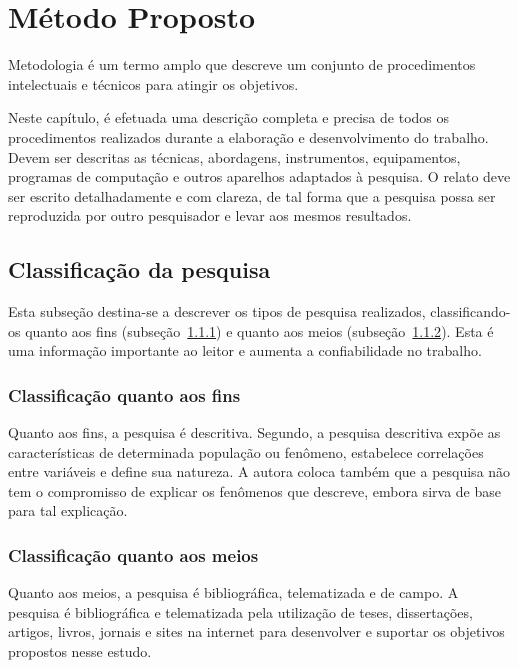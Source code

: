 \chapter{Método Proposto}
\label{cap:metodologia}

Metodologia é um termo amplo que descreve um conjunto de procedimentos intelectuais e técnicos para atingir os objetivos.

Neste capítulo, é efetuada uma descrição completa e precisa de todos os procedimentos realizados durante a elaboração e desenvolvimento do trabalho. Devem ser descritas as técnicas, abordagens, instrumentos, equipamentos, programas de computação e outros aparelhos adaptados à pesquisa. O relato deve ser escrito detalhadamente e com clareza, de tal forma que a pesquisa possa ser reproduzida por outro pesquisador e levar aos mesmos resultados.

\section{Classificação da pesquisa}
Esta subseção destina-se a descrever os tipos de pesquisa realizados, classificando-os quanto aos fins (subseção~\ref{sec:fins}) e quanto aos meios (subseção~\ref{sec:meios}). Esta é uma informação importante ao leitor e aumenta a confiabilidade no trabalho.

\subsection{Classificação quanto aos fins} \label{sec:fins}

Quanto aos fins, a pesquisa é descritiva. Segundo, a pesquisa descritiva expõe as características de determinada população ou fenômeno, estabelece correlações entre variáveis e define sua natureza. A autora coloca também que a pesquisa não tem o compromisso de explicar os fenômenos que descreve, embora sirva de base para tal explicação. 

\subsection{Classificação quanto aos meios} \label{sec:meios}

Quanto aos meios, a pesquisa é bibliográfica, telematizada e de campo. A pesquisa é bibliográfica e telematizada pela utilização de teses, dissertações, artigos, livros, jornais e sites na internet para desenvolver e suportar os objetivos propostos nesse estudo. 

